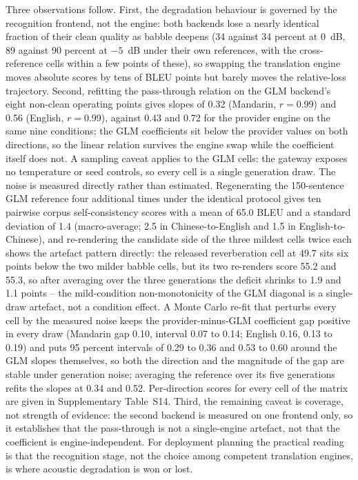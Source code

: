 Three observations follow. First, the degradation behaviour is governed by
the recognition frontend, not the engine: both backends lose a nearly
identical fraction of their clean quality as babble deepens (34 against
34 percent at 0~dB, 89 against 90 percent at $-5$~dB under their own
references, with the cross-reference cells within a few points of these),
so swapping the translation engine moves absolute scores by tens of BLEU
points but barely moves the relative-loss trajectory. Second, refitting
the pass-through relation on the GLM backend's eight non-clean operating
points gives slopes of 0.32 (Mandarin, $r=$0.99) and 0.56 (English, $r=$0.99),
against 0.43 and 0.72 for the provider engine on the same nine
conditions; the GLM coefficients sit below the provider values on both directions, so the linear relation survives the engine swap while the coefficient itself does not.
A sampling caveat applies to the GLM cells: the gateway exposes no
temperature or seed controls, so every cell is a single generation draw.
The noise is measured directly rather than estimated. Regenerating the
150-sentence GLM reference four additional times under the identical
protocol gives ten pairwise corpus self-consistency scores with a mean of
65.0 BLEU and a standard deviation of 1.4 (macro-average; 2.5 in
Chinese-to-English and 1.5 in English-to-Chinese), and re-rendering the
candidate side of the three mildest cells twice each shows the artefact
pattern directly: the released reverberation cell at 49.7 sits six points
below the two milder babble cells, but its two re-renders score 55.2 and
55.3, so after averaging over the three generations the deficit shrinks to
1.9 and 1.1 points -- the mild-condition non-monotonicity of the GLM
diagonal is a single-draw artefact, not a condition effect. A Monte Carlo
re-fit that perturbs every cell by the measured noise keeps the
provider-minus-GLM coefficient gap positive in every draw (Mandarin gap
0.10, interval 0.07 to 0.14; English 0.16, 0.13 to 0.19) and puts 95
percent intervals of 0.29 to 0.36 and 0.53 to 0.60 around the GLM slopes
themselves, so both the direction and the magnitude of the gap are stable
under generation noise; averaging the reference over its five generations
refits the slopes at 0.34 and 0.52. Per-direction scores for every cell of
the matrix are given in Supplementary Table~S14. Third, the
remaining caveat is coverage, not strength of evidence: the second
backend is measured on one frontend only, so it establishes that the
pass-through is not a single-engine artefact, not that the coefficient is
engine-independent. For deployment planning the practical reading is
that the recognition stage, not the choice among competent translation
engines, is where acoustic degradation is won or lost.

